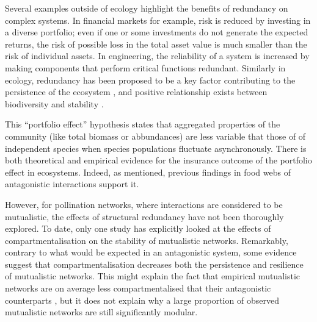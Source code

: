 \documentclass[a4paper]{article}
\begin{document}
Several examples outside of ecology highlight the benefits of redundancy on complex systems.
In financial markets for example, risk is reduced by investing in a diverse portfolio; even if one or some investments do not generate the expected returns, the risk of possible loss in the total asset value is much smaller than the risk of individual assets.
In engineering, the reliability of a system is increased by making components that perform critical functions redundant.
Similarly in ecology, redundancy has been proposed to be a key factor contributing to the persistence of the ecosystem \autocite{Naeem1997,Naeem1998}, and positive relationship exists between biodiversity and stability \autocite{Tilman1996, Doak1998,Tilman1998}.

This ``portfolio effect'' hypothesis states that aggregated properties of the community (like total biomass or abbundances) are less variable that those of of independent species when species populations fluctuate asynchronously.
There is both theoretical \autocite{Tilman1998, Yachi1999} and empirical \autocite{Tilman1996,Tilman2006, Valone2008, Hector2010, Valone2008} evidence for the insurance outcome of the portfolio effect in ecosystems.
Indeed, as mentioned, previous findings in food webs of antagonistic interactions support it.

However, for pollination networks, where interactions are considered to be mutualistic, the effects of structural redundancy have not been thoroughly explored.
To date, only one study \autocite{Thebault2010} has explicitly looked at the effects of compartmentalisation on the stability of mutualistic networks.
Remarkably, contrary to what would be expected in an antagonistic system, some evidence suggest that compartmentalisation decreases both the persistence and resilience of mutualistic networks.
This might explain the fact that empirical mutualistic networks are on average less compartmentalised that their antagonistic counterparts \autocite{Thebault2010}, but it does not explain why a large proportion of observed mutualistic networks are still significantly modular.
\end{document}
